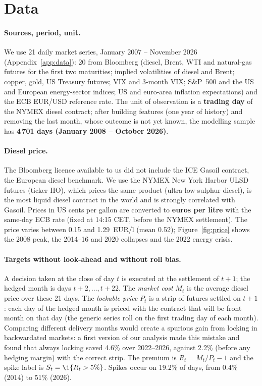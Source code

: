 \section{Data}\label{sec:data}

\paragraph{Sources, period, unit.} We use 21 daily market series, January 2007 -- November 2026
(Appendix~\ref{app:data}): 20 from Bloomberg (diesel, Brent, WTI and natural-gas futures for the first two
maturities; implied volatilities of diesel and Brent; copper, gold, US Treasury futures; VIX and 3-month VIX;
S\&P~500 and the US and European energy-sector indices; US and euro-area inflation expectations) and the
ECB EUR/USD reference rate. The unit of observation is a \textbf{trading day} of the NYMEX diesel contract;
after building features (one year of history) and removing the last month, whose outcome is not yet known,
the modelling sample has \textbf{4\,701 days (January 2008 -- October 2026)}.

\paragraph{Diesel price.} The Bloomberg licence available to us did not include the ICE Gasoil contract,
the European diesel benchmark. We use the NYMEX New York Harbor ULSD futures (ticker HO), which prices the
same product (ultra-low-sulphur diesel), is the most liquid diesel contract in the world and is strongly
correlated with Gasoil. Prices in US cents per gallon are converted to \textbf{euros per litre} with the
same-day ECB rate (fixed at 14:15 CET, before the NYMEX settlement). The price varies between 0.15 and
1.29~EUR/l (mean 0.52); Figure~\ref{fig:price} shows the 2008 peak, the 2014--16 and 2020 collapses
and the 2022 energy crisis.

\paragraph{Targets without look-ahead and without roll bias.} A decision taken at the close of day $t$ is
executed at the settlement of $t+1$; the hedged month is days $t+2,\dots,t+22$. The \emph{market cost}
$M_t$ is the average diesel price over these 21 days. The \emph{lockable price} $P_t$ is a strip of futures
settled on $t+1$: each day of the hedged month is priced with the contract that will be front month on that
day (the generic series roll on the first trading day of each month). Comparing different delivery months
would create a spurious gain from locking in backwardated markets: a first version of our analysis made this
mistake and found that always locking saved 4.6\% over 2022--2026, against 2.2\% (before any hedging margin)
with the correct strip. The premium is $R_t=M_t/P_t-1$ and the
spike label is $S_t=\1\{R_t>5\%\}$. Spikes occur on 19.2\% of days, from 0.4\% (2014) to 51\% (2026).

